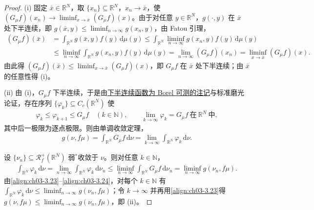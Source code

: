 \documentclass[../../main.tex]{subfiles}%
\begin{document}
\begin{proof}
(i) 固定 $\bar x\in\mathbb{R}^N$，取 $\{x_n\}\subseteq\mathbb{R}^N$，$x_n\to\bar x$，使 $(G_\mu f)(x_n)\to\liminf_{x\to\bar x}(G_\mu f)(x)$。由于对任意 $y\in\mathbb{R}^N$，$g(\cdot,y)$ 在 $\bar x$ 处下半连续，即 $g(\bar x,y)\leqslant\liminf_{n\to\infty}g(x_n,y)$，由 Fatou 引理，
\begin{align*}
(G_\mu f)(\bar x)&=\int_{\mathbb{R}^N}g(\bar x,y)f(y)\,\mathrm{d}\mu(y)
\leqslant\int_{\mathbb{R}^N}\liminf_{n\to\infty}g(x_n,y)f(y)\,\mathrm{d}\mu(y)\\
&\leqslant\liminf_{n\to\infty}\int_{\mathbb{R}^N}g(x_n,y)f(y)\,\mathrm{d}\mu(y)
=\lim_{n\to\infty}(G_\mu f)(x_n)=\liminf_{x\to\bar x}(G_\mu f)(x).
\end{align*}
由此得 $(G_\mu f)(\bar x)\leqslant\liminf_{x\to\bar x}(G_\mu f)(x)$，即 $G_\mu f$ 在 $\bar x$ 处下半连续；由 $\bar x$ 的任意性得 (i)。

(ii) 由 (i)，$G_\mu f$ 下半连续，于是由\hyperref[remark:ch02-连续半连续Borel]{下半连续函数为 Borel 可测的注记}与标准磨光论证，存在序列 $\{\varphi_k\}\subseteq C_c(\mathbb{R}^N)$ 使
\begin{align*}
\varphi_k\leqslant\varphi_{k+1}\leqslant G_\mu f\quad(k\in\mathbb{N}),\qquad
\lim_{k\to\infty}\varphi_k=G_\mu f\ \text{在}\ \mathbb{R}^N\ \text{中},
\end{align*}
其中后一极限为逐点极限。则由单调收敛定理，
\begin{align}
g(\nu,f\mu)=\int_{\mathbb{R}^N}G_\mu f\,\mathrm{d}\nu=\lim_{k\to\infty}\int_{\mathbb{R}^N}\varphi_k\,\mathrm{d}\nu.\label{align:ch03-3.23}
\end{align}

设 $\{\nu_n\}\subseteq\mathscr{R}^+_f(\mathbb{R}^N)$ 弱$^*$收敛于 $\nu$。则对任意 $k\in\mathbb{N}$，
\begin{align}
\int_{\mathbb{R}^N}\varphi_k\,\mathrm{d}\nu=\lim_{n\to\infty}\int_{\mathbb{R}^N}\varphi_k\,\mathrm{d}\nu_n
\leqslant\liminf_{n\to\infty}\int_{\mathbb{R}^N}G_\mu f\,\mathrm{d}\nu_n=\liminf_{n\to\infty}g(\nu_n,f\mu).\label{align:ch03-3.24}
\end{align}
由\eqref{align:ch03-3.23}--\eqref{align:ch03-3.24}，对每个 $k\in\mathbb{N}$ 有 $\int_{\mathbb{R}^N}\varphi_k\,\mathrm{d}\nu\leqslant\liminf_{n\to\infty}g(\nu_n,f\mu)$；令 $k\to\infty$ 并再用\eqref{align:ch03-3.23}得 $g(\nu,f\mu)\leqslant\liminf_{n\to\infty}g(\nu_n,f\mu)$，即 (ii)。
\end{proof}
\end{document}
